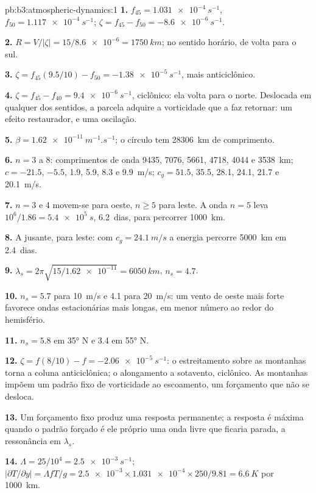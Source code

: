 \begin{solution}{pb:b3:atmospheric-dynamics:1}
\textbf{1.} $f_{45} = \qty{1.031e-4}{s^{-1}}$, $f_{50} =
\qty{1.117e-4}{s^{-1}}$; $\zeta = f_{45} - f_{50} = \qty{-8.6e-6}{s^{-1}}$.

\textbf{2.} $R = V/|\zeta| = 15/\num{8.6e-6} = \qty{1750}{km}$; no sentido horário,
de volta para o sul.

\textbf{3.} $\zeta = f_{45}(9.5/10) - f_{50} = \qty{-1.38e-5}{s^{-1}}$, mais
anticiclônico.

\textbf{4.} $\zeta = f_{45} - f_{40} = \qty{+9.4e-6}{s^{-1}}$, ciclônico: ela
volta para o norte. Deslocada em qualquer dos sentidos, a parcela adquire a
vorticidade que a faz retornar: um efeito restaurador, e uma oscilação.

\textbf{5.} $\beta = \qty{1.62e-11}{m^{-1}.s^{-1}}$; o círculo tem
\qty{28306}{km} de comprimento.

\textbf{6.} $n = 3$ a 8: comprimentos de onda 9435, 7076, 5661, 4718, 4044 e
\qty{3538}{km}; $c = -21.5$, $-5.5$, 1.9, 5.9, 8.3 e \qty{9.9}{m/s}; $c_g
= 51.5$, 35.5, 28.1, 24.1, 21.7 e \qty{20.1}{m/s}.

\textbf{7.} $n = 3$ e 4 movem-se para oeste, $n \ge 5$ para leste. A onda $n = 5$ leva
$10^6/1.86 = \qty{5.4e5}{s}$, \num{6.2}~dias, para percorrer \qty{1000}{km}.

\textbf{8.} A jusante, para leste: com $c_g = \qty{24.1}{m/s}$ a energia percorre
\qty{5000}{km} em \num{2.4}~dias.

\textbf{9.} $\lambda_s = 2\pi\sqrt{15/\num{1.62e-11}} = \qty{6050}{km}$,
$n_s = 4.7$.

\textbf{10.} $n_s = 5.7$ para \qty{10}{m/s} e 4.1 para \qty{20}{m/s}: um
vento de oeste mais forte favorece ondas estacionárias mais longas, em menor
número ao redor do hemisfério.

\textbf{11.} $n_s = 5.8$ em \ang{35} N e 3.4 em \ang{55} N.

\textbf{12.} $\zeta = f(8/10) - f = \qty{-2.06e-5}{s^{-1}}$: o estreitamento
sobre as montanhas torna a coluna anticiclônica; o alongamento a sotavento,
ciclônico. As montanhas impõem um padrão fixo de vorticidade ao escoamento,
um forçamento que não se desloca.

\textbf{13.} Um forçamento fixo produz uma resposta permanente; a resposta é
máxima quando o padrão forçado é ele próprio uma onda livre que ficaria
parada, a ressonância em $\lambda_s$.

\textbf{14.} $\Lambda = 25/10^4 = \qty{2.5e-3}{s^{-1}}$;
$|\partial T/\partial y| = \Lambda fT/g = \num{2.5e-3}\times\num{1.031e-4}
\times250/9.81 = \qty{6.6}{K}$ por \qty{1000}{km}.


\end{solution}
